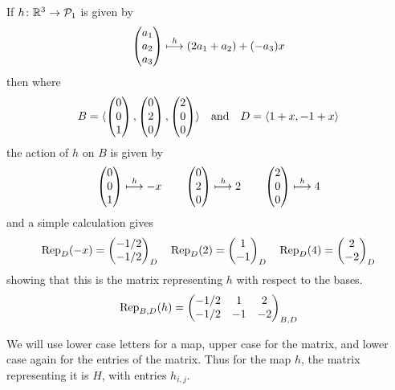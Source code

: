 \begin{example}  \label{ex:PolyOneToRThree}
If \( \map{h}{\Re^3}{\polyspace_1} \) is given by
\begin{equation*}
  \colvec{a_1 \\ a_2 \\ a_3}
     \mapsunder{h}
   (2a_1+a_2)+(-a_3)x
\end{equation*}
then where
\begin{equation*}
  B=
  \sequence{\colvec{0 \\ 0 \\ 1},
            \colvec{0 \\ 2 \\ 0},
            \colvec{2 \\ 0 \\ 0} }
  \quad\text{and}\quad
  D=
  \sequence{1+x,-1+x}
\end{equation*}
the action of \( h \) on \( B \) is given by
\begin{equation*}
  \colvec{0 \\ 0 \\ 1}\mapsunder{h}-x
  \qquad \colvec{0 \\ 2 \\ 0}\mapsunder{h}2
  \qquad \colvec{2 \\ 0 \\ 0}\mapsunder{h}4
\end{equation*}
and a simple calculation gives
\begin{equation*}
  \rep{-x}{D}=\colvec{-1/2 \\ -1/2}_D
  \quad \rep{2}{D}=\colvec{1 \\ -1}_D 
  \quad \rep{4}{D}=\colvec{2 \\ -2}_D 
\end{equation*}
showing that this is the matrix representing $h$ with respect to the bases.
\begin{equation*}
  \rep{h}{B,D}
   =
   \begin{pmatrix}
     -1/2  &1   &2  \\
     -1/2  &-1  &-2
   \end{pmatrix}_{B,D}
\end{equation*}
\end{example}

We will use lower case letters for a map, 
upper case for the matrix,
and lower case again for the entries of the matrix.
Thus for the map \( h \), the matrix representing it is \( H \), with
entries \( h_{i,j} \).


